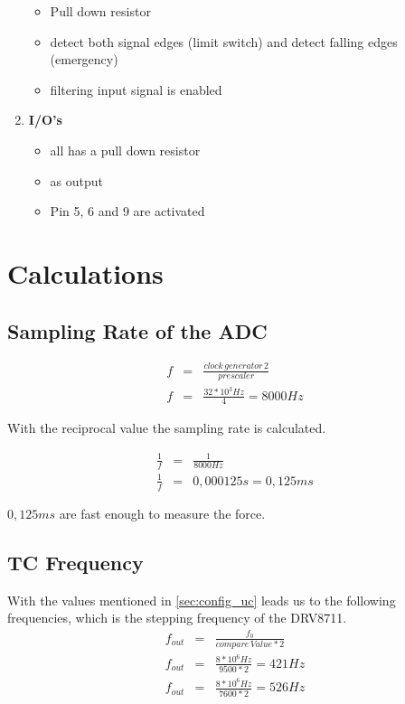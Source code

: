 \documentclass[a4paper,12pt]{scrreprt}
\begin{document}
\begin{enumerate}
\begin{itemize}
\item Pull down resistor
\item detect both signal edges (limit switch) and detect falling edges (emergency)
\item filtering input signal is enabled
\end{itemize}
\item\textbf{ \acs{I/O}'s}
\begin{itemize}
\item all has a pull down resistor
\item as output
\item Pin 5, 6 and 9 are activated
\end{itemize}
\end{enumerate}

\section{Calculations}

\subsection{Sampling Rate of the \acs{ADC}}

\begin{eqnarray}
f&=&\frac{clock \, generator \, 2}{prescaler}\\
f&=&\frac{32*10^{3}Hz}{4}=8000Hz
\end{eqnarray}

With the reciprocal value the sampling rate is calculated.

\begin{eqnarray}
\frac{1}{f}&=&\frac{1}{8000Hz}\\
\frac{1}{f}&=&0,000125s=0,125ms
\end{eqnarray}

$0,125ms$ are fast enough to measure the force.

\subsection{\acs{TC} Frequency}
With the values mentioned in \autoref{sec:config_uc} leads us to the following frequencies, which is the stepping frequency of the DRV8711.
\begin{eqnarray}
f_{out} &=& \frac{f_{0}}{compare \, Value *2}\\
f_{out} &=& \frac{8*10^{6}Hz}{9500*2}=421Hz\label{eq:frequency1}\\
f_{out} &=& \frac{8*10^{6}Hz}{7600*2}=526Hz\label{eq:frequency2}
\end{eqnarray}
\end{document}
